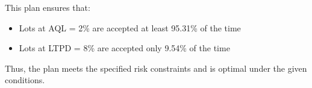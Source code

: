 \documentclass[twoside]{book}
\begin{document}
This plan ensures that:
\begin{itemize}
    \item Lots at AQL = 2\% are accepted at least 95.31\% of the time
    \item Lots at LTPD = 8\% are accepted only 9.54\% of the time
\end{itemize}

Thus, the plan meets the specified risk constraints and is optimal under the given conditions.

%
%
%
%
%
\end{document}
